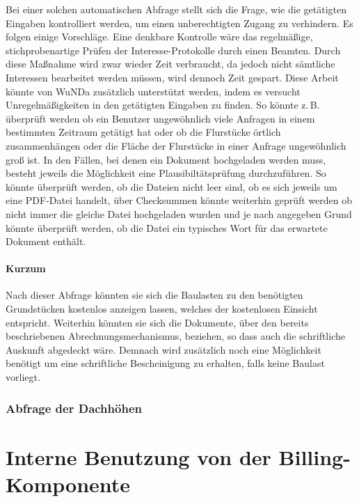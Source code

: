 Bei einer solchen automatischen Abfrage stellt sich die Frage, wie die getätigten Eingaben kontrolliert werden, um einen unberechtigten Zugang zu verhindern.
Es folgen einige Vorschläge.
Eine denkbare Kontrolle wäre das regelmäßige, stichprobenartige Prüfen der Interesse-Protokolle durch einen Beamten.
Durch diese Maßnahme wird zwar wieder Zeit verbraucht, da jedoch nicht sämtliche Interessen bearbeitet werden müssen, wird dennoch Zeit gespart.
Diese Arbeit könnte von \ac{WuNDa} zusätzlich unterstützt werden, indem es versucht Unregelmäßigkeiten in den getätigten Eingaben zu finden.
So könnte z.\,B. überprüft werden ob ein Benutzer ungewöhnlich viele Anfragen in einem bestimmten Zeitraum getätigt hat oder ob die Flurstücke örtlich zusammenhängen oder die Fläche der Flurstücke in einer Anfrage ungewöhnlich groß ist.
In den Fällen, bei denen ein Dokument hochgeladen werden muss, besteht jeweils die Möglichkeit eine Plausibiltätsprüfung durchzuführen.
So könnte überprüft werden, ob die Dateien nicht leer sind, ob es sich jeweils um eine PDF-Datei handelt, über Checksummen könnte weiterhin geprüft werden ob nicht immer die gleiche Datei hochgeladen wurden und je nach angegeben Grund könnte überprüft werden, ob die Datei ein typisches Wort für das erwartete Dokument enthält.  


\subsubsection{Kurzum}
Nach dieser Abfrage könnten sie sich die Baulasten zu den benötigten Grundstücken kostenlos anzeigen lassen, welches der kostenlosen Einsicht entspricht.
Weiterhin könnten sie sich die Dokumente, über den bereits beschriebenen Abrechnungsmechanismus, beziehen, so dass auch die schriftliche Auskunft abgedeckt wäre.
Demnach wird zusätzlich noch eine Möglichkeit benötigt um eine schriftliche Bescheinigung zu erhalten, falls keine Baulast vorliegt.




\subsection{Abfrage der Dachhöhen}
\label{subsec:dachhoehen}


\chapter{Interne Benutzung von der Billing-Komponente}